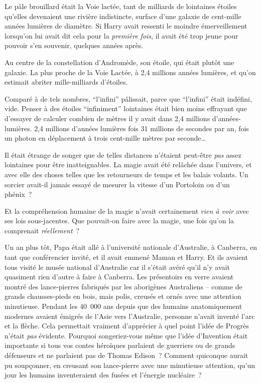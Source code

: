 Le pâle brouillard était la Voie lactée, tant de milliards de lointaines étoiles qu'elles devenaient une rivière indistincte, surface d'une galaxie de cent-mille années lumières de diamètre.
Si Harry avait ressenti le moindre émerveillement lorsqu'on lui avait dit cela pour la \emph{première} \emph{fois}, il avait été trop jeune pour pouvoir s'en souvenir, quelques années après.

Au centre de la constellation d'Andromède, son étoile, qui était plutôt une galaxie.
La plus proche de la Voie Lactée, à 2,4 millions années lumières, et qu'on estimait abriter mille-milliards d'étoiles.

Comparé à de tels nombres, “l'infini” pâlissait, parce que “l'infini” était indéfini, vide.
Penser à des étoiles “infiniment” lointaines était bien moins effrayant que d'essayer de calculer combien de mètres il y avait dans 2,4 millions d'années-lumières.
2,4 millions d'années lumières fois 31 millions de secondes par an, fois un photon en déplacement à trois cent-mille mètres par seconde…

Il était étrange de songer que de telles distances n'étaient peut-être \emph{pas} assez lointaines pour être inatteignables.
La magie avait été relâchée dans l'univers, et avec elle des choses telles que les retourneurs de temps et les balais volants.
Un sorcier avait-il jamais essayé de mesurer la vitesse d'un Portoloin ou d'un phénix~?

Et la compréhension humaine de la magie n'avait certainement \emph{rien à voir} avec ses lois sous-jacentes.
Que pouvait-on faire avec la magie, une fois qu'on la comprenait \emph{réellement}~?

Un an plus tôt, Papa était allé à l'université nationale d'Australie, à Canberra, en tant que conférencier invité, et il avait emmené Maman et Harry.
Et ils avaient tous visité le musée national d'Australie car il s'était avéré qu'il n'y avait quasiment rien d'autre à faire à Canberra.
Les présentoirs en verre avaient montré des lance-pierres fabriqués par les aborigènes Australiens -- comme de grands chausses-pieds en bois, mais polis, creusés et ornés avec une attention minutieuse.
Pendant les 40~000 ans depuis que des humains anatomiquement modernes avaient émigrés de l'Asie vers l'Australie, personne n'avait inventé l'arc et la flèche.
Cela permettait vraiment d'apprécier à quel point l'idée de Progrès n'était \emph{pas} évidente.
Pourquoi songeriez-vous même que l'idée d'Invention était importante si tous vos contes héroïques parlaient de guerriers ou de grands défenseurs et ne parlaient pas de Thomas Edison~?
Comment quiconque aurait pu soupçonner, en creusant son lance-pierre avec une minutieuse attention, qu'un jour les humains inventeraient des fusées et l'énergie nucléaire~?

